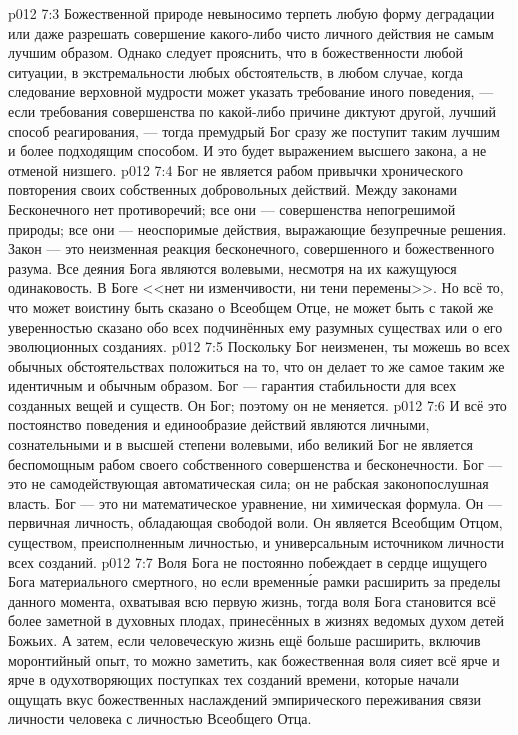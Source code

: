 \vs p012 7:3 Божественной природе невыносимо терпеть любую форму деградации или даже разрешать совершение какого\hyp{}либо чисто личного действия не самым лучшим образом. Однако следует прояснить, что  в божественности любой ситуации, в экстремальности любых обстоятельств, в любом случае, когда следование верховной мудрости может указать требование иного поведения, --- если требования совершенства по какой\hyp{}либо причине диктуют другой, лучший способ реагирования, --- тогда премудрый Бог сразу же поступит таким лучшим и более подходящим способом. И это будет выражением высшего закона, а не отменой низшего.
\vs p012 7:4 Бог не является рабом привычки хронического повторения своих собственных добровольных действий. Между законами Бесконечного нет противоречий; все они --- совершенства непогрешимой природы; все они --- неоспоримые действия, выражающие безупречные решения. Закон --- это неизменная реакция бесконечного, совершенного и божественного разума. Все деяния Бога являются волевыми, несмотря на их кажущуюся одинаковость. В Боге <<нет ни изменчивости, ни тени перемены>>. Но всё то, что может воистину быть сказано о Всеобщем Отце, не может быть с такой же уверенностью сказано обо всех подчинённых ему разумных существах или о его эволюционных созданиях.
\vs p012 7:5 Поскольку Бог неизменен, ты можешь во всех обычных обстоятельствах положиться на то, что он делает то же самое таким же идентичным и обычным образом. Бог --- гарантия стабильности для всех созданных вещей и существ. Он Бог; поэтому он не меняется.
\vs p012 7:6 И всё это постоянство поведения и единообразие действий являются личными, сознательными и в высшей степени волевыми, ибо великий Бог не является беспомощным рабом своего собственного совершенства и бесконечности. Бог --- это не самодействующая автоматическая сила; он не рабская законопослушная власть. Бог --- это ни математическое уравнение, ни химическая формула. Он --- первичная личность, обладающая свободой воли. Он является Всеобщим Отцом, существом, преисполненным личностью, и универсальным источником личности всех созданий.
\vs p012 7:7 \pc Воля Бога не постоянно побеждает в сердце ищущего Бога материального смертного, но если временн\'ые рамки расширить за пределы данного момента, охватывая всю первую жизнь, тогда воля Бога становится всё более заметной в духовных плодах, принесённых в жизнях ведомых духом детей Божьих. А затем, если человеческую жизнь ещё больше расширить, включив моронтийный опыт, то можно заметить, как божественная воля сияет всё ярче и ярче в одухотворяющих поступках тех созданий времени, которые начали ощущать вкус божественных наслаждений эмпирического переживания связи личности человека с личностью Всеобщего Отца.
